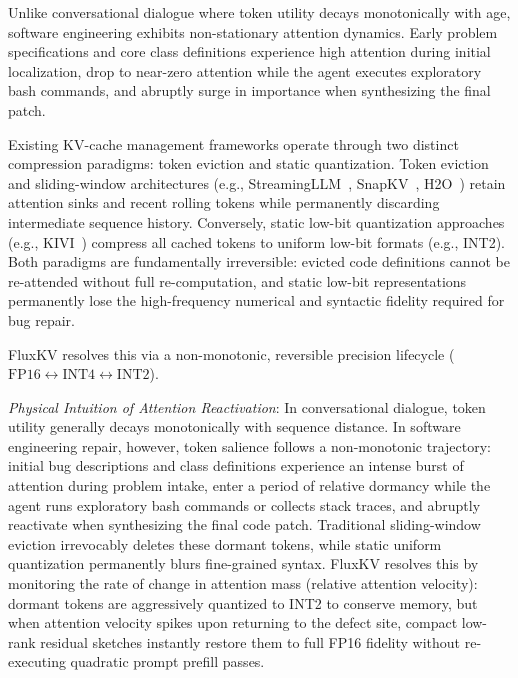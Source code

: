 \documentclass[10pt,twocolumn]{article}
\begin{document}
Unlike conversational dialogue where token utility decays monotonically with age, software engineering exhibits non-stationary attention dynamics. Early problem specifications and core class definitions experience high attention during initial localization, drop to near-zero attention while the agent executes exploratory bash commands, and abruptly surge in importance when synthesizing the final patch.

Existing KV-cache management frameworks operate through two distinct compression paradigms: token eviction and static quantization. Token eviction and sliding-window architectures (e.g., StreamingLLM~\cite{xiao2024streamingllm}, SnapKV~\cite{li2024snapkv}, H2O~\cite{zhang2024h2o}) retain attention sinks and recent rolling tokens while permanently discarding intermediate sequence history. Conversely, static low-bit quantization approaches (e.g., KIVI~\cite{liu2024kivi}) compress all cached tokens to uniform low-bit formats (e.g., INT2). Both paradigms are fundamentally irreversible: evicted code definitions cannot be re-attended without full re-computation, and static low-bit representations permanently lose the high-frequency numerical and syntactic fidelity required for bug repair.

FluxKV resolves this via a non-monotonic, reversible precision lifecycle ($\text{FP16} \leftrightarrow \text{INT4} \leftrightarrow \text{INT2}$). 

\textit{Physical Intuition of Attention Reactivation}: In conversational dialogue, token utility generally decays monotonically with sequence distance. In software engineering repair, however, token salience follows a non-monotonic trajectory: initial bug descriptions and class definitions experience an intense burst of attention during problem intake, enter a period of relative dormancy while the agent runs exploratory bash commands or collects stack traces, and abruptly reactivate when synthesizing the final code patch. Traditional sliding-window eviction irrevocably deletes these dormant tokens, while static uniform quantization permanently blurs fine-grained syntax. FluxKV resolves this by monitoring the rate of change in attention mass (relative attention velocity): dormant tokens are aggressively quantized to INT2 to conserve memory, but when attention velocity spikes upon returning to the defect site, compact low-rank residual sketches instantly restore them to full FP16 fidelity without re-executing quadratic prompt prefill passes.
\end{document}
